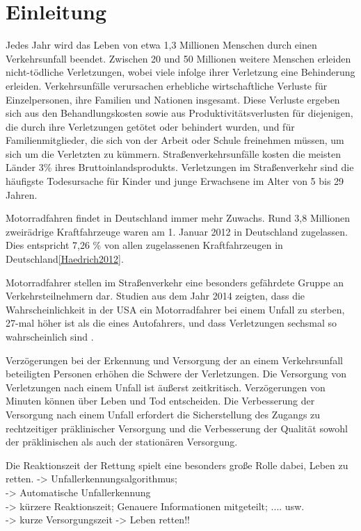 \chapter{Einleitung}
%
%
%
%
%
%
Jedes Jahr wird das Leben von etwa 1,3 Millionen Menschen durch einen Verkehrsunfall beendet. Zwischen 20 und 50 Millionen weitere Menschen erleiden nicht-tödliche Verletzungen, wobei viele infolge ihrer Verletzung eine Behinderung erleiden. Verkehrsunfälle verursachen erhebliche wirtschaftliche Verluste für Einzelpersonen, ihre Familien und Nationen insgesamt. Diese Verluste ergeben sich aus den Behandlungskosten sowie aus Produktivitätsverlusten für diejenigen, die durch ihre Verletzungen getötet oder behindert wurden, und für Familienmitglieder, die sich von der Arbeit oder Schule freinehmen müssen, um sich um die Verletzten zu kümmern. Straßenverkehrsunfälle kosten die meisten Länder 3\% ihres Bruttoinlandsprodukts. Verletzungen im Straßenverkehr sind die häufigste Todesursache für Kinder und junge Erwachsene im Alter von 5 bis 29 Jahren.\cite{healthorganization2022}

Motorradfahren findet in Deutschland immer mehr Zuwachs.  Rund 3,8 Millionen zweirädrige Kraftfahrzeuge waren am 1. Januar 2012 in Deutschland zugelassen. Dies entspricht 7,26 \% von allen zugelassenen Kraftfahrzeugen in Deutschland\autoref{Haedrich2012}.

Motorradfahrer stellen im Straßenverkehr eine besonders gefährdete Gruppe an Verkehrsteilnehmern dar. Studien aus dem Jahr 2014 zeigten, dass die Wahrscheinlichkeit in der USA ein Motorradfahrer bei einem Unfall zu sterben, 27-mal höher ist als die eines Autofahrers, und dass Verletzungen sechsmal so wahrscheinlich sind \cite{NHTSA}.

Verzögerungen bei der Erkennung und Versorgung der an einem Verkehrsunfall beteiligten Personen erhöhen die Schwere der Verletzungen. Die Versorgung von Verletzungen nach einem Unfall ist äußerst zeitkritisch. Verzögerungen von Minuten können über Leben und Tod entscheiden. Die Verbesserung der Versorgung nach einem Unfall erfordert die Sicherstellung des Zugangs zu rechtzeitiger präklinischer Versorgung und die Verbesserung der Qualität sowohl der präklinischen als auch der stationären Versorgung.\cite{healthorganization2022}

Die Reaktionszeit der Rettung spielt eine besonders große Rolle dabei, Leben zu retten.
-> Unfallerkennungsalgorithmus; \\
-> Automatische Unfallerkennung \\
-> kürzere Reaktionszeit; Genauere Informationen mitgeteilt; .... usw.\\
-> kurze Versorgungszeit -> Leben retten!!\\

